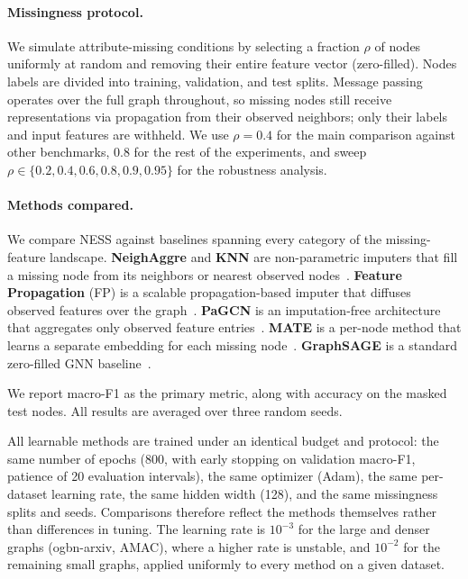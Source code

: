 \paragraph{Missingness protocol.} 
We simulate attribute-missing conditions by selecting a fraction $\rho$ of nodes uniformly at random and removing their entire feature vector (zero-filled). 
Nodes labels are divided into training, validation, and test splits.
Message passing operates over the full graph throughout, so missing nodes still receive representations via propagation from their observed neighbors; only their labels and input features are withheld.
We use $\rho=0.4$ for the main comparison against other benchmarks, $0.8$ for the rest of the experiments, and sweep $\rho \in \{0.2,0.4,0.6,0.8,0.9,0.95\}$ for the robustness analysis.



\paragraph{Methods compared.} We compare NESS against baselines spanning every category of the missing-feature landscape. \textbf{NeighAggre} and \textbf{KNN} are non-parametric imputers that fill a missing node from its neighbors or nearest observed nodes~\cite{you2020handling}. \textbf{Feature Propagation} (FP) is a scalable propagation-based imputer that diffuses observed features over the graph~\cite{rossi2022unreasonable}. \textbf{PaGCN} is an imputation-free architecture that aggregates only observed feature entries~\cite{zhang2024incomplete}. \textbf{MATE} is a per-node method that learns a separate embedding for each missing node~\cite{peng2023mate}. \textbf{GraphSAGE} is a standard zero-filled GNN baseline~\cite{hamilton2017inductive}.

We report macro-F1 as the primary metric, along with accuracy on the masked test nodes. All results are averaged over three random seeds.

All learnable methods are trained under an identical budget and protocol: the same number of epochs (800, with early stopping on validation macro-F1, patience of 20 evaluation intervals), the same optimizer (Adam), the same per-dataset learning rate, the same hidden width (128), and the same missingness splits and seeds. Comparisons therefore reflect the methods themselves rather than differences in tuning. The learning rate is $10^{-3}$ for the large and denser graphs (ogbn-arxiv, AMAC), where a higher rate is unstable, and $10^{-2}$ for the remaining small graphs, applied uniformly to every method on a given dataset.

